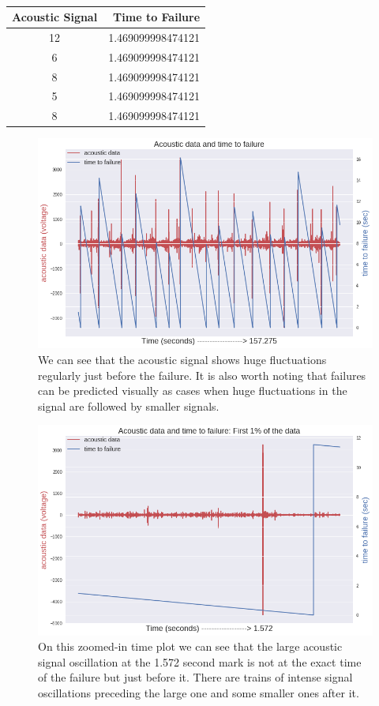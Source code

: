 \documentclass[]{llncs} %
\begin{document}
\begin{table}
	\begin{center}
		\caption{}
		\label{tab:SampleData}
		\begin{tabular}{c|r} 
			\textbf{Acoustic Signal} & \textbf{Time to Failure}\\
			\hline
			12 & 1.469099998474121 \\ 
			6 & 1.469099998474121 \\ 
			8 & 1.469099998474121 \\ 
			5 & 1.469099998474121 \\ 
			8 & 1.469099998474121 \\ 
		\end{tabular}
	\end{center}
\end{table}
\begin{figure}
	\centering
	\includegraphics[width=.9\linewidth]{timeSeries}
	\caption{We can see that the acoustic signal shows huge fluctuations regularly just before the failure. It is also worth noting that failures can be predicted visually as cases when huge fluctuations in the signal are followed by smaller signals.}
	\label{fig:timeseries}
\end{figure}
\begin{figure}
	\centering
	\includegraphics[width=.9\linewidth]{zoomedInTimePLot}
	\caption{On this zoomed-in time plot we can see that the large acoustic signal oscillation at the 1.572 second mark is not at the exact time of the failure but  just before it. There are trains of intense signal oscillations preceding the large one and some smaller ones after it.}
	\label{fig:zoomeInTimePlot}
\end{figure}
\end{document}
